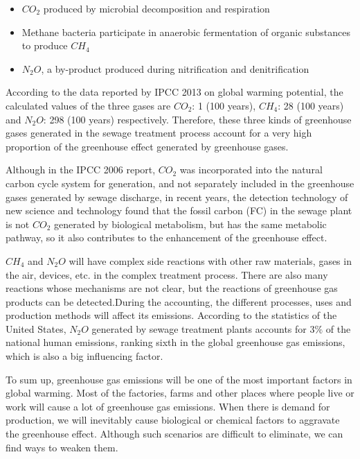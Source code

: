 \documentclass{apmcmthesis}
\begin{document}
\begin{itemize}
  \item $CO_2$ produced by microbial decomposition and respiration
  \item Methane bacteria participate in anaerobic fermentation of organic substances to produce $CH_4$
  \item $N_2O$, a by-product produced during nitrification and denitrification
\end{itemize}

According to the data reported by IPCC 2013\cite{105} on global warming potential, the calculated values of the three gases are $CO_2$: 1 (100 years), $CH_4$: 28 (100 years) and $N_2O$: 298 (100 years) respectively. Therefore, these three kinds of greenhouse gases generated in the sewage treatment process account for a very high proportion of the greenhouse effect generated by greenhouse gases.

Although in the IPCC 2006\cite{106}\cite{107} report, $CO_2$ was incorporated into the natural carbon cycle system for generation, and not separately included in the greenhouse gases generated by sewage discharge, in recent years, the detection technology of new science and technology found that the fossil carbon (FC) in the sewage plant is not $CO_2$ generated by biological metabolism, but has the same metabolic pathway, so it also contributes to the enhancement of the greenhouse effect.

$CH_4$ and $N_2O$ will have complex side reactions with other raw materials, gases in the air, devices, etc. in the complex treatment process. There are also many reactions whose mechanisms are not clear, but the reactions of greenhouse gas products can be detected.During the accounting, the different processes, uses and production methods will affect its emissions. According to the statistics of the United States, $N_2O$ generated by sewage treatment plants accounts for 3$\%$ of the national human emissions\cite{108}, ranking sixth in the global greenhouse gas emissions, which is also a big influencing factor.

To sum up, greenhouse gas emissions will be one of the most important factors in global warming. Most of the factories, farms and other places where people live or work will cause a lot of greenhouse gas emissions. When there is demand for production, we will inevitably cause biological or chemical factors to aggravate the greenhouse effect. Although such scenarios are difficult to eliminate, we can find ways to weaken them.
\end{document}
